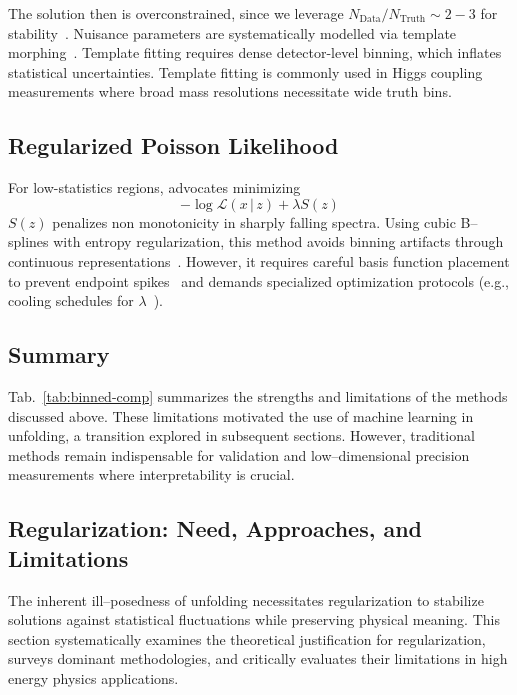 The solution then is overconstrained, since we leverage \(N_{\text{Data}}/N_{\text{Truth}} \sim 2-3\) for stability~\cite{britzger_linear_2022}.
%
Nuisance parameters are systematically modelled via template morphing~\cite{baak_interpolation_2015}.
%
Template fitting requires dense detector-level binning, which inflates statistical uncertainties. Template fitting is commonly used in Higgs coupling measurements where broad mass resolutions necessitate wide truth bins.
\subsection{Regularized Poisson Likelihood}  
For low-statistics regions, \cite{gaponenko_practical_2020} advocates minimizing
\begin{equation}
     -\log \mathcal{L}(x\,|\,z) + \lambda S(z)
\end{equation}  
\(S(z)\) penalizes non monotonicity in sharply falling spectra.
%
Using cubic B--splines with entropy regularization, this method avoids binning artifacts through continuous representations~\cite{gaponenko_practical_2020}.
%
However, it requires careful basis function placement to prevent endpoint spikes~\cite{fan_analysis_2022} and demands specialized optimization protocols (e.g., cooling schedules for \(\lambda\)~\cite{jia_sparse_2019}).

    \subsection{Summary}  
        
        Tab.~\ref{tab:binned-comp} summarizes the strengths and limitations of the methods discussed above.
        These limitations motivated the use of machine learning in unfolding, a transition explored in subsequent sections.
        However, traditional methods remain indispensable for validation and low--dimensional precision measurements where interpretability is crucial.
        
        \subsection{Regularization: Need, Approaches, and Limitations}
        The inherent ill--posedness of unfolding necessitates regularization to stabilize solutions against statistical fluctuations while preserving physical meaning.
        This section systematically examines the theoretical justification for regularization, surveys dominant methodologies, and critically evaluates their limitations in high energy physics applications.
        
